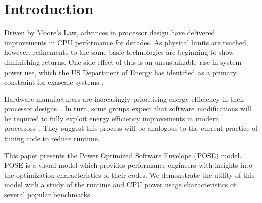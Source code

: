 \section{Introduction}
Driven by Moore's Law, advances in processor design have delivered improvements in CPU performance for decades. As physical limits are reached, however, refinements to the same basic technologies are beginning to show diminishing returns. One side-effect of this is an unsustainable rise in system power use, which the US Department of Energy has identified as a primary constraint for exascale systems \cite{shalf:2011aa}.

Hardware manufacturers are increasingly prioritising energy efficiency in their processor designs~\cite{kurd:2014aa}.
In turn, some groups expect that software modifications will be required to fully exploit energy efficiency improvements in modern processors~\cite{shao:2013aa}.
They suggest this process will be analogous to the current practice of tuning code to reduce runtime.

This paper presents the Power Optimized Software Envelope (POSE) model.
POSE is a visual model which provides performance engineers with insights into the optimization characteristics of their codes.
We demonstrate the utility of this model with a study of the runtime and CPU power usage characteristics of several popular benchmarks.
